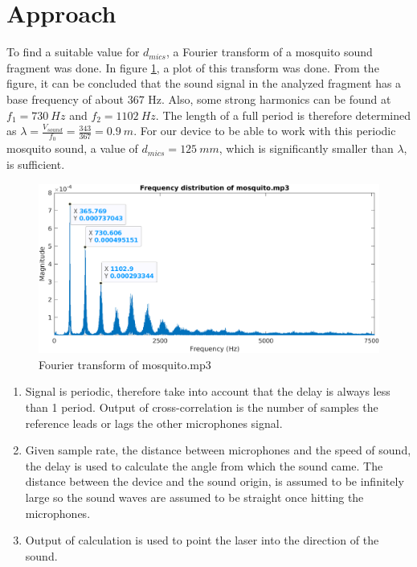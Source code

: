 \documentclass[a4paper]{article}
\begin{document}
\section{Approach}

To find a suitable value for $d_{mics}$, a Fourier transform of a mosquito sound fragment \cite{mosquito_fragment} was done. In figure \ref{fig:mosquito_fourier}, a plot of this transform was done. From the figure, it can be concluded that the sound signal in the analyzed fragment has a base frequency of about $367$ Hz. Also, some strong harmonics can be found at $f_1 = 730\ Hz$ and $f_2 = 1102\ Hz$. The length of a full period is therefore determined as $\lambda = \frac{V_{sound}}{f_0} = \frac{343}{367} = 0.9\ m$. For our device to be able to work with this periodic mosquito sound, a value of $d_{mics} = 125\ mm$, which is significantly smaller than $\lambda$, is sufficient.

\begin{figure}
        \includegraphics[width=34em]{assets/mosquito_fourier.png}
        \caption{Fourier transform of mosquito.mp3}
        \label{fig:mosquito_fourier}
    
\end{figure}

\begin{enumerate}
    \item Signal is periodic, therefore take into account that the delay is always less than 1 period. Output of cross-correlation is the number of samples the reference leads or lags the other microphones signal.
    \item Given sample rate, the distance between microphones and the speed of sound, the delay is used to calculate the angle from which the sound came. The distance between the device and the sound origin, is assumed to be infinitely large so the sound waves are assumed to be straight once hitting the microphones.
    \item Output of calculation is used to point the laser into the direction of the sound.
\end{enumerate}
\end{document}
